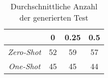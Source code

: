\bgroup
\def\arraystretch{2}
\begin{table}[H]
	\vspace{.5cm}
	\centering		
	\begin{center}
		\begin{tabular}{|c||c|c|c|}
			\hline 
			& 0 & 0.25 & 0.5 \\
			\hline 
			\hline
			\textit{Zero-Shot} & 52 & 59 & 57 \\
			\hline
			\textit{One-Shot} & 45 & 45 & 44 \\
			\hline
		\end{tabular} 
	\end{center}
	\caption{Durchschnittliche Anzahl der generierten Test}
	\label{fig:unit}
	\vspace{-.8cm}
\end{table}
\egroup